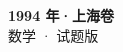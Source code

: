 \documentclass[zihao=-4, a4paper]{ctexart}
\begin{document}
\begin{center}
  {\Large\bfseries 1994 年·上海卷}\\[4pt]
  {\large 数学 · 试题版}
\end{center}
\medskip
{}

\end{document}
